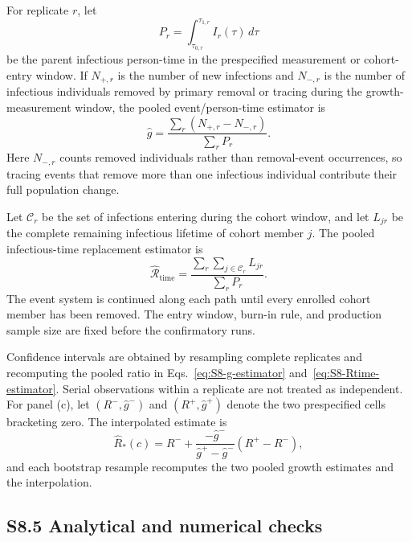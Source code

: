 \documentclass[9pt,a4paper]{article}
\begin{document}
For replicate $r$, let
\begin{equation}
P_r=\int_{\tau_{0,r}}^{\tau_{1,r}}I_r(\tau)\,d\tau
\label{eq:S8-parent-person-time}
\end{equation}
be the parent infectious person-time in the prespecified measurement or cohort-entry window. If $N_{+,r}$ is the number of new infections and $N_{-,r}$ is the number of infectious individuals removed by primary removal or tracing during the growth-measurement window, the pooled event/person-time estimator is
\begin{equation}
\widehat g
=
\frac{\sum_r(N_{+,r}-N_{-,r})}{\sum_rP_r}.
\label{eq:S8-g-estimator}
\end{equation}
Here $N_{-,r}$ counts removed individuals rather than removal-event occurrences, so tracing events that remove more than one infectious individual contribute their full population change.

Let $\mathcal C_r$ be the set of infections entering during the cohort window, and let $L_{jr}$ be the complete remaining infectious lifetime of cohort member $j$. The pooled infectious-time replacement estimator is
\begin{equation}
\widehat{\mathcal R}_{\mathrm{time}}
=
\frac{\displaystyle\sum_r\sum_{j\in\mathcal C_r}L_{jr}}
{\displaystyle\sum_rP_r}.
\label{eq:S8-Rtime-estimator}
\end{equation}
The event system is continued along each path until every enrolled cohort member has been removed. The entry window, burn-in rule, and production sample size are fixed before the confirmatory runs.

Confidence intervals are obtained by resampling complete replicates and recomputing the pooled ratio in Eqs.~\eqref{eq:S8-g-estimator} and~\eqref{eq:S8-Rtime-estimator}. Serial observations within a replicate are not treated as independent. For panel (c), let $(R^-,\widehat g^-)$ and $(R^+,\widehat g^+)$ denote the two prespecified cells bracketing zero. The interpolated estimate is
\begin{equation}
\widehat R_*(c)
=R^-+
\frac{-\widehat g^-}{\widehat g^+-\widehat g^-}
(R^+-R^-),
\label{eq:S8-threshold-estimator}
\end{equation}
and each bootstrap resample recomputes the two pooled growth estimates and the interpolation.

\subsection*{S8.5 Analytical and numerical checks}
\end{document}
